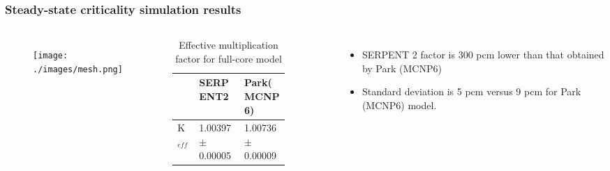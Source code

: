 \begin{frame}
  \frametitle{Steady-state criticality simulation results}
     \begin{columns}
       \column[t]{5.5cm}
    \begin{figure}[t]
   \vspace{-0.15in}
   \hspace*{-0.15in}
      \texttt{[image: ./images/mesh.png]}
    \end{figure}
    
    \column[t]{6.5cm}
    \vspace{-0.30in}
\begin{table}[h!]
\caption{Effective multiplication factor for full-core model}
\begin{tabular}{p{0.08\linewidth} p{0.35\linewidth} p{0.35\linewidth}} \toprule
      & SERPENT2      & Park(MCNP6)\cite{park_whole_2015}          \\ \midrule
K$_{eff}$  & 1.00397$\pm$0.00005 & 1.00736$\pm$0.00009
\\
\bottomrule
\end{tabular}
  \label{tab:keff}
       \end{table}
       
       \begin{itemize}
         \item SERPENT 2 factor is 300 pcm lower than that obtained
         by Park (MCNP6) \cite{park_whole_2015}
         \item Standard deviation is 5 pcm versus 9 pcm for Park (MCNP6) model.
       \end{itemize}

     \end{columns}
\end{frame}

